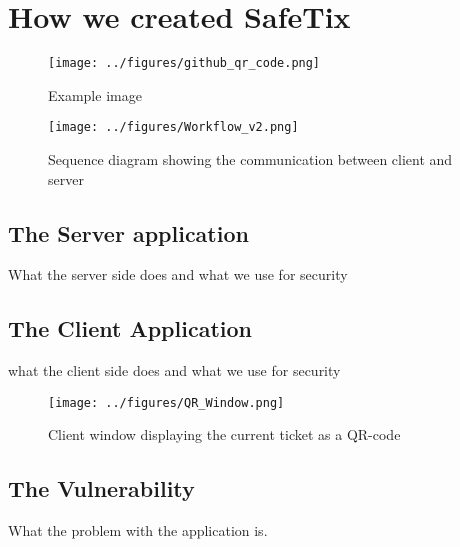 \section{How we created SafeTix}
\begin{figure}[h]
    \centering
    \texttt{[image: ../figures/github\_qr\_code.png]}
    \caption{Example image}
    \label{fig:screenshot}
\end{figure}
\begin{figure}[h]
    \centering
    \texttt{[image: ../figures/Workflow\_v2.png]}
    \caption{Sequence diagram showing the communication between client and server}
    \label{fig:WorkFlow1}
\end{figure}
\subsection{The Server application}
What the server side does and what we use for security
\subsection{The Client Application}
what the client side does and what we use for security
\begin{figure}[h]
    \centering
    \texttt{[image: ../figures/QR\_Window.png]}
    \caption{Client window displaying the current ticket as a QR-code}
    \label{fig:WorkFlow1}
\end{figure}
\subsection{The Vulnerability}
What the problem with the application is.

